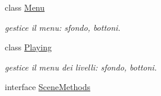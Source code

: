 \begin{DoxyCompactItemize}
class \hyperlink{classscenes_1_1_menu}{Menu}
\begin{DoxyCompactList}\small\item\em gestice il menu\+: sfondo, bottoni. \end{DoxyCompactList}\item 
class \hyperlink{classscenes_1_1_playing}{Playing}
\begin{DoxyCompactList}\small\item\em gestice il menu dei livelli\+: sfondo, bottoni. \end{DoxyCompactList}\item 
interface \hyperlink{interfacescenes_1_1_scene_methods}{Scene\+Methods}
\end{DoxyCompactItemize}
